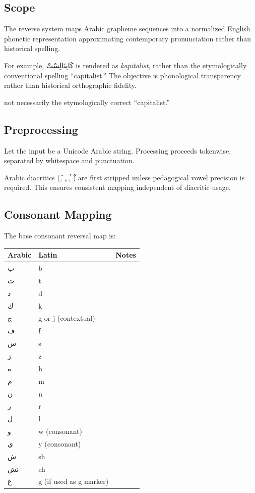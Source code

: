 \documentclass[12pt]{article}
\newcommand{\AR}[1]{\foreignlanguage{arabic}{#1}}
\begin{document}
\subsection{Scope}

The reverse system maps Arabic grapheme sequences into a normalized English phonetic representation approximating contemporary pronunciation rather than historical spelling.

For example, \AR{كَابِتَالِسْتْ} is rendered as \textit{kapitalist}, rather than the etymologically conventional spelling ``capitalist.'' The objective is phonological transparency rather than historical orthographic fidelity.

not necessarily the etymologically correct ``capitalist.''

\subsection{Preprocessing}

Let the input be a Unicode Arabic string. Processing proceeds tokenwise, separated by whitespace and punctuation.

Arabic diacritics (\AR{َ}, \AR{ِ}, \AR{ُ}, \AR{ْ}) are first stripped unless pedagogical vowel precision is required. This ensures consistent mapping independent of diacritic usage.

\subsection{Consonant Mapping}

The base consonant reversal map is:

\begin{center}
\begin{tabular}{lll}
Arabic & Latin & Notes \\
\hline
\AR{ب} & b & \\
\AR{ت} & t & \\
\AR{د} & d & \\
\AR{ك} & k & \\
\AR{ج} & g or j (contextual) & \\
\AR{ف} & f & \\
\AR{س} & s & \\
\AR{ز} & z & \\
\AR{ه} & h & \\
\AR{م} & m & \\
\AR{ن} & n & \\
\AR{ر} & r & \\
\AR{ل} & l & \\
\AR{و} & w (consonant) & \\
\AR{ي} & y (consonant) & \\
\AR{ش} & sh & \\
\AR{تش} & ch & \\
\AR{غ} & g (if used as g marker) & \\
\end{tabular}
\end{center}
\end{document}
